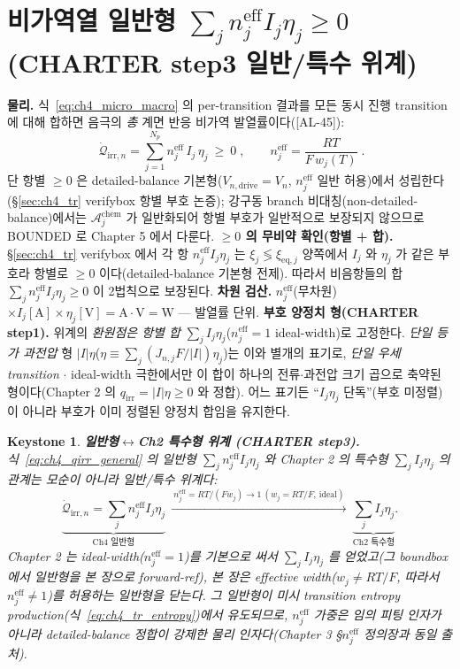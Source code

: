 \documentclass[11pt,a4paper]{article}
\newtheorem*{keybox}{Keystone}
\newcommand{\eff}{\mathrm{eff}}
\newcommand{\eq}{\mathrm{eq}}
\newcommand{\drive}{\mathrm{drive}}
\newcommand{\irr}{\mathrm{irr}}
\newcommand{\chem}{\mathrm{chem}}
\newcommand{\AL}[1]{\textsf{[AL-#1]}}
\begin{document}
\section{비가역열 일반형 $\sum_j n_j^{\eff}I_j\eta_j\ge0$ (CHARTER step3 일반/특수 위계)}\label{sec:ch4_general}
\textbf{물리.} 식~\eqref{eq:ch4_micro_macro} 의 per-transition 결과를 모든 동시 진행 transition 에 대해 합하면
음극의 \emph{총} 계면 반응 비가역 발열률이다(\AL{45}):
\begin{equation}
\boxed{\;\dot{\mathcal Q}_{\irr,n}=\sum_{j=1}^{N_p} n_j^{\eff}\,I_j\,\eta_j\ \ge\ 0\;,\qquad
n_j^{\eff}=\frac{RT}{F\,w_j(T)}\;.}
\label{eq:ch4_qirr_general}
\end{equation}
단 항별 $\ge0$ 은 detailed-balance 기본형($V_{n,\drive}=V_n$, $n_j^{\eff}$ 일반 허용)에서 성립한다(\S\ref{sec:ch4_tr}
verifybox 항별 부호 논증); 강구동 branch 비대칭(non-detailed-balance)에서는 $\mathcal A_j^{\chem}$ 가 일반화되어
항별 부호가 일반적으로 보장되지 않으므로 BOUNDED 로 Chapter 5 에서 다룬다.
\textbf{$\ge0$ 의 무비약 확인(항별 + 합).} \S\ref{sec:ch4_tr} verifybox 에서 각 항 $n_j^{\eff}I_j\eta_j$ 는
$\xi_j\lessgtr\xi_{\eq,j}$ 양쪽에서 $I_j$ 와 $\eta_j$ 가 같은 부호라 항별로 $\ge0$ 이다(detailed-balance
기본형 전제). 따라서 비음항들의 합 $\sum_j n_j^{\eff}I_j\eta_j\ge0$ 이 2법칙으로 보장된다. \textbf{차원 검산.}
$n_j^{\eff}$(무차원)$\times I_j[\mathrm A]\times\eta_j[\mathrm V]=\mathrm{A\cdot V}=\mathrm W$ — 발열률 단위.
\textbf{부호 양정치 형(CHARTER step1).} 위계의 \emph{환원점은 항별 합} $\sum_j I_j\eta_j$($n_j^{\eff}=1$
ideal-width)로 고정한다. \emph{단일 등가 과전압} 형 $|I|\eta$($\eta\equiv\sum_j(J_{n,j}F/|I|)\eta_j$)는 이와
별개의 표기로, \emph{단일 우세 transition} $\cdot$ ideal-width 극한에서만 이 합이 하나의 전류$\cdot$과전압 크기
곱으로 축약된 형이다(Chapter 2 의 $q_\irr=|I|\eta\ge0$ 와 정합). 어느 표기든 ``$I_j\eta_j$ 단독''(부호 미정렬)이
아니라 부호가 이미 정렬된 양정치 합임을 유지한다.

\begin{keybox}
\textbf{일반형$\leftrightarrow$Ch2 특수형 위계 (CHARTER step3).} 식~\eqref{eq:ch4_qirr_general} 의 \emph{일반형}
$\sum_j n_j^{\eff}I_j\eta_j$ 와 Chapter 2 의 \emph{특수형} $\sum_j I_j\eta_j$ 의 관계는 \emph{모순이 아니라
일반/특수 위계}다:
\begin{equation}
\underbrace{\dot{\mathcal Q}_{\irr,n}=\sum_j n_j^{\eff}I_j\eta_j}_{\text{Ch4 일반형}}
\ \xrightarrow{\ n_j^{\eff}=RT/(Fw_j)\to1\ (w_j=RT/F,\ \text{ideal})\ }\
\underbrace{\sum_j I_j\eta_j}_{\text{Ch2 특수형}}.
\label{eq:ch4_hierarchy}
\end{equation}
Chapter 2 는 ideal-width($n_j^{\eff}=1$)를 기본으로 써서 $\sum_j I_j\eta_j$ 를 얻었고(그 boundbox 에서 일반형을
본 장으로 forward-ref), 본 장은 effective width($w_j\ne RT/F$, 따라서 $n_j^{\eff}\ne1$)를 허용하는 일반형을
닫는다. 그 일반형이 미시 transition entropy production(식~\eqref{eq:ch4_tr_entropy})에서 유도되므로, $n_j^{\eff}$
가중은 임의 피팅 인자가 아니라 \emph{detailed-balance 정합이 강제한} 물리 인자다(Chapter 3 \S$n_j^{\eff}$
정의장과 동일 출처).
\end{keybox}
\end{document}
